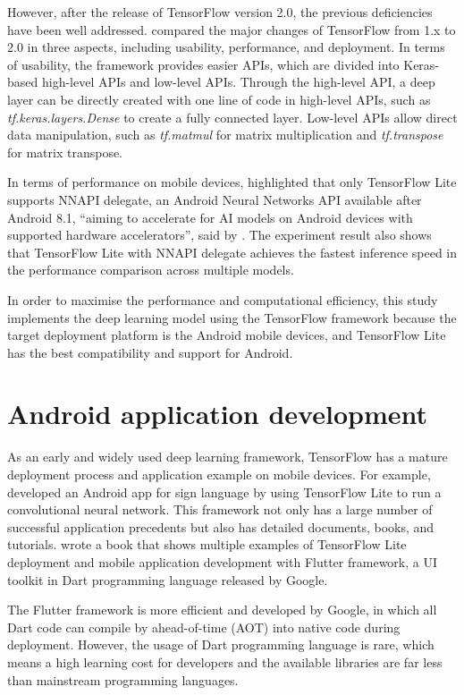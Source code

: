 However, after the release of TensorFlow version 2.0, the previous deficiencies have been well addressed.
\citet{singh2020introduction} compared the major changes of TensorFlow from 1.x to 2.0 in three aspects, including usability, performance, and deployment.
In terms of usability, the framework provides easier APIs, which are divided into Keras-based high-level APIs and low-level APIs.
Through the high-level API, a deep layer can be directly created with one line of code in high-level APIs, such as \textit{tf.keras.layers.Dense} to create a fully connected layer.
Low-level APIs allow direct data manipulation, such as \textit{tf.matmul} for matrix multiplication and \textit{tf.transpose} for matrix transpose.

In terms of performance on mobile devices, \citet{luo2020comparison} highlighted that only TensorFlow Lite supports NNAPI delegate, an Android Neural Networks API available after Android 8.1, ``aiming to accelerate for AI models on Android devices with supported hardware accelerators'', said by \citet{luo2020comparison}.
The experiment result also shows that TensorFlow Lite with NNAPI delegate achieves the fastest inference speed in the performance comparison across multiple models.

In order to maximise the performance and computational efficiency, this study implements the deep learning model using the TensorFlow framework because the target deployment platform is the Android mobile devices, and TensorFlow Lite has the best compatibility and support for Android.

\section{Android application development}
As an early and widely used deep learning framework, TensorFlow has a mature deployment process and application example on mobile devices.
For example, \citet{fadlilah2021development} developed an Android app for sign language by using TensorFlow Lite to run a convolutional neural network.
This framework not only has a large number of successful application precedents but also has detailed documents, books, and tutorials.
\citet{singh2020mobile} wrote a book that shows multiple examples of TensorFlow Lite deployment and mobile application development with Flutter framework, a UI toolkit in Dart programming language released by Google.

The Flutter framework is more efficient and developed by Google, in which all Dart code can compile by ahead-of-time (AOT) into native code during deployment.
However, the usage of Dart programming language is rare, which means a high learning cost for developers and the available libraries are far less than mainstream programming languages.

